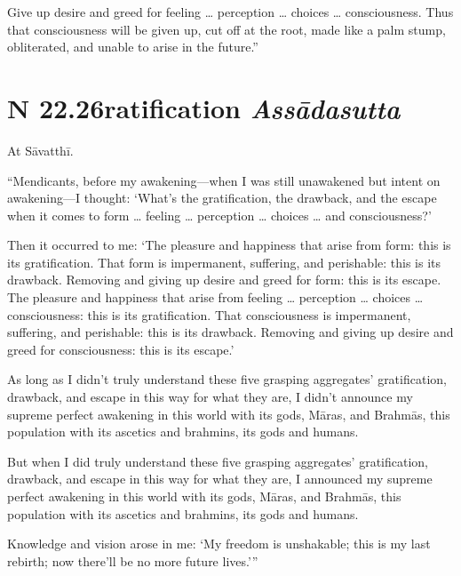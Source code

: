 \documentclass[12pt,openany]{book}%
\newcommand*{\suttatitleacronym}[1]{\smaller[2]{#1}\vspace*{.3em}}
\newcommand*{\suttatitletranslation}[1]{\linebreak{#1}}
\newcommand*{\suttatitleroot}[1]{\linebreak\smaller[2]\itshape{#1}}
\newcommand*{\tocacronym}[1]{\hspace*{-3.3em}{#1}\quad}
\newcommand*{\toctranslation}[1]{#1}
\newcommand*{\tocroot}[1]{(\textit{#1})}
\begin{document}
Give up desire and greed for feeling … perception … choices … consciousness. Thus that consciousness will be given up, cut off at the root, made like a palm stump, obliterated, and unable to arise in the future.” 

%
\section*{{\suttatitleacronym SN 22.26}{\suttatitletranslation Gratification }{\suttatitleroot Assādasutta}}
\addcontentsline{toc}{section}{\tocacronym{SN 22.26} \toctranslation{Gratification } \tocroot{Assādasutta}}

At \textsanskrit{Sāvatthī}. 

“Mendicants, before my awakening—when I was still unawakened but intent on awakening—I thought: ‘What’s the gratification, the drawback, and the escape when it comes to form … feeling … perception … choices … and consciousness?’ 

Then it occurred to me: ‘The pleasure and happiness that arise from form: this is its gratification. That form is impermanent, suffering, and perishable: this is its drawback. Removing and giving up desire and greed for form: this is its escape. The pleasure and happiness that arise from feeling … perception … choices … consciousness: this is its gratification. That consciousness is impermanent, suffering, and perishable: this is its drawback. Removing and giving up desire and greed for consciousness: this is its escape.’ 

As long as I didn’t truly understand these five grasping aggregates’ gratification, drawback, and escape in this way for what they are, I didn’t announce my supreme perfect awakening in this world with its gods, \textsanskrit{Māras}, and \textsanskrit{Brahmās}, this population with its ascetics and brahmins, its gods and humans. 

But when I did truly understand these five grasping aggregates’ gratification, drawback, and escape in this way for what they are, I announced my supreme perfect awakening in this world with its gods, \textsanskrit{Māras}, and \textsanskrit{Brahmās}, this population with its ascetics and brahmins, its gods and humans. 

Knowledge and vision arose in me: ‘My freedom is unshakable; this is my last rebirth; now there’ll be no more future lives.’” 
\end{document}
